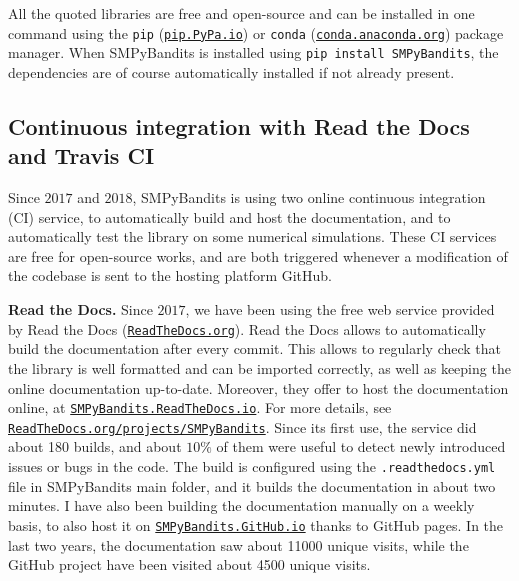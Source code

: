 All the quoted libraries are free and open-source and can be installed in one command using the \texttt{pip} (\texttt{\href{https://pip.pypa.io/}{pip.PyPa.io}}) or \texttt{conda} (\texttt{\href{http://conda.anaconda.org/}{conda.anaconda.org}}) package manager.
%
When SMPyBandits is installed using \texttt{pip install SMPyBandits}, the dependencies are of course automatically installed if not already present.


\subsection{Continuous integration with Read the Docs and Travis CI}

Since $2017$ and $2018$, SMPyBandits is using two online continuous integration (CI) service, to automatically build and host the documentation, and to automatically test the library on some numerical simulations.
%
These CI services are free for open-source works, and are both triggered whenever a modification of the codebase is sent to the hosting platform GitHub.

\textbf{Read the Docs.}
Since $2017$, we have been using the free web service provided by Read the Docs (\href{https://readthedocs.org/}{\texttt{ReadTheDocs.org}}).
Read the Docs allows to automatically build the documentation after every commit. This allows to regularly check that the library is well formatted and can be imported correctly, as well as keeping the online documentation up-to-date.
Moreover, they offer to host the documentation online, at \href{https://smpybandits.rtfd.io/}{\texttt{SMPyBandits.ReadTheDocs.io}}.
For more details, see \href{https://readthedocs.org/projects/smpybandits/}{\texttt{ReadTheDocs.org/projects/SMPyBandits}}.
%
Since its first use, the service did about 180 builds, and about $10\%$ of them were useful to detect newly introduced issues or bugs in the code.
The build is configured using the \texttt{.readthedocs.yml} file in SMPyBandits main folder, and it builds the documentation in about two minutes.
I have also been building the documentation manually on a weekly basis, to also host it on \href{https://smpybandits.github.io/}{\texttt{SMPyBandits.GitHub.io}} thanks to GitHub pages.
In the last two years, the documentation saw about 11000 unique visits, while the GitHub project have been visited about 4500 unique visits.


